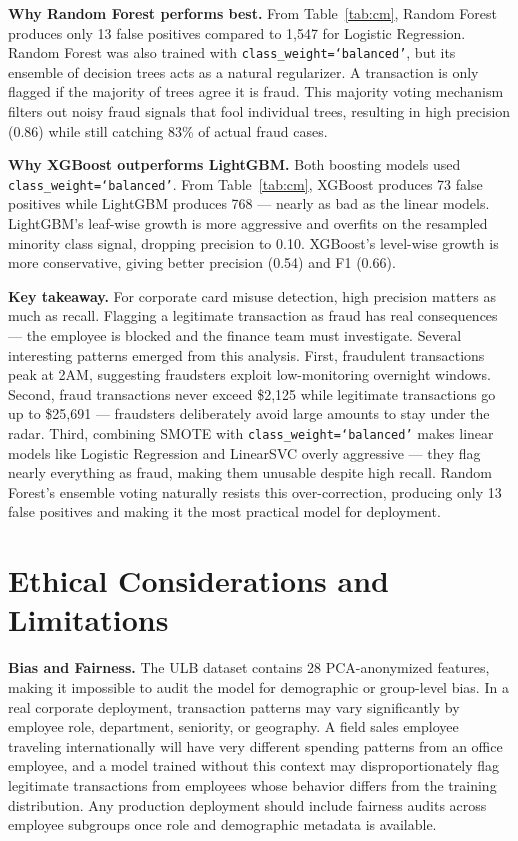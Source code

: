\documentclass{article}
\begin{document}
\textbf{Why Random Forest performs best.}
From Table~\ref{tab:cm}, Random Forest produces only 13 false positives
compared to 1,547 for Logistic Regression. Random Forest was also trained
with \texttt{class\_weight=`balanced'}, but its ensemble of decision
trees acts as a natural regularizer. A transaction is only flagged if
the majority of trees agree it is fraud. This majority voting mechanism
filters out noisy fraud signals that fool individual trees, resulting in
high precision (0.86) while still catching 83\% of actual fraud cases.

\textbf{Why XGBoost outperforms LightGBM.}
Both boosting models used \texttt{class\_weight=`balanced'}. From
Table~\ref{tab:cm}, XGBoost produces 73 false positives while LightGBM
produces 768 --- nearly as bad as the linear models. LightGBM's
leaf-wise growth is more aggressive and overfits on the resampled
minority class signal, dropping precision to 0.10. XGBoost's level-wise
growth is more conservative, giving better precision (0.54) and F1
(0.66).

\textbf{Key takeaway.}
For corporate card misuse detection, high precision matters as much as
recall. Flagging a legitimate transaction as fraud has real consequences
--- the employee is blocked and the finance team must investigate.
Several interesting patterns emerged from this analysis. First,
fraudulent transactions peak at 2AM, suggesting fraudsters exploit
low-monitoring overnight windows. Second, fraud transactions never exceed
\$2,125 while legitimate transactions go up to \$25,691 --- fraudsters
deliberately avoid large amounts to stay under the radar. Third,
combining SMOTE with \texttt{class\_weight=`balanced'} makes linear
models like Logistic Regression and LinearSVC overly aggressive ---
they flag nearly everything as fraud, making them unusable despite high
recall. Random Forest's ensemble voting naturally resists this
over-correction, producing only 13 false positives and making it the
most practical model for deployment.

\section{Ethical Considerations and Limitations}

\textbf{Bias and Fairness.}
The ULB dataset contains 28 PCA-anonymized features, making it
impossible to audit the model for demographic or group-level bias. In a
real corporate deployment, transaction patterns may vary significantly by
employee role, department, seniority, or geography. A field sales
employee traveling internationally will have very different spending
patterns from an office employee, and a model trained without this
context may disproportionately flag legitimate transactions from
employees whose behavior differs from the training distribution. Any
production deployment should include fairness audits across employee
subgroups once role and demographic metadata is available.
\end{document}
